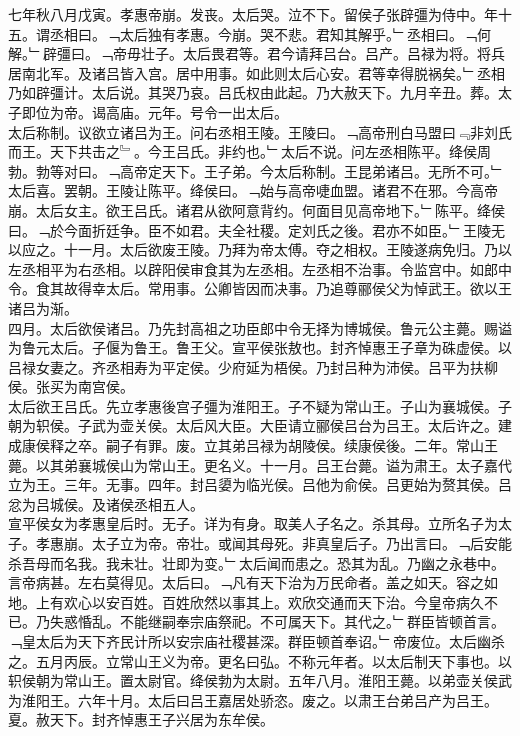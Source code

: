 \documentclass{zhvt-classic}
\begin{document}
\hspace*{2em}七年秋八月戊寅。孝惠帝崩。发丧。太后哭。泣不下。留侯子张辟彊为侍中。年十五。谓丞相曰。﹁太后独有孝惠。今崩。哭不悲。君知其解乎。﹂丞相曰。﹁何解。﹂辟彊曰。﹁帝毋壮子。太后畏君等。君今请拜吕台。吕产。吕禄为将。将兵居南北军。及诸吕皆入宫。居中用事。如此则太后心安。君等幸得脱祸矣。﹂丞相乃如辟彊计。太后说。其哭乃哀。吕氏权由此起。乃大赦天下。九月辛丑。葬。太子即位为帝。谒高庙。元年。号令一出太后。\\
\hspace*{2em}太后称制。议欲立诸吕为王。问右丞相王陵。王陵曰。﹁高帝刑白马盟曰﹃非刘氏而王。天下共击之﹄。今王吕氏。非约也。﹂太后不说。问左丞相陈平。绛侯周勃。勃等对曰。﹁高帝定天下。王子弟。今太后称制。王昆弟诸吕。无所不可。﹂太后喜。罢朝。王陵让陈平。绛侯曰。﹁始与高帝啑血盟。诸君不在邪。今高帝崩。太后女主。欲王吕氏。诸君从欲阿意背约。何面目见高帝地下。﹂陈平。绛侯曰。﹁於今面折廷争。臣不如君。夫全社稷。定刘氏之後。君亦不如臣。﹂王陵无以应之。十一月。太后欲废王陵。乃拜为帝太傅。夺之相权。王陵遂病免归。乃以左丞相平为右丞相。以辟阳侯审食其为左丞相。左丞相不治事。令监宫中。如郎中令。食其故得幸太后。常用事。公卿皆因而决事。乃追尊郦侯父为悼武王。欲以王诸吕为渐。\\
\hspace*{2em}四月。太后欲侯诸吕。乃先封高祖之功臣郎中令无择为博城侯。鲁元公主薨。赐谥为鲁元太后。子偃为鲁王。鲁王父。宣平侯张敖也。封齐悼惠王子章为硃虚侯。以吕禄女妻之。齐丞相寿为平定侯。少府延为梧侯。乃封吕种为沛侯。吕平为扶柳侯。张买为南宫侯。\\
\hspace*{2em}太后欲王吕氏。先立孝惠後宫子彊为淮阳王。子不疑为常山王。子山为襄城侯。子朝为轵侯。子武为壶关侯。太后风大臣。大臣请立郦侯吕台为吕王。太后许之。建成康侯释之卒。嗣子有罪。废。立其弟吕禄为胡陵侯。续康侯後。二年。常山王薨。以其弟襄城侯山为常山王。更名义。十一月。吕王台薨。谥为肃王。太子嘉代立为王。三年。无事。四年。封吕嬃为临光侯。吕他为俞侯。吕更始为赘其侯。吕忿为吕城侯。及诸侯丞相五人。\\
\hspace*{2em}宣平侯女为孝惠皇后时。无子。详为有身。取美人子名之。杀其母。立所名子为太子。孝惠崩。太子立为帝。帝壮。或闻其母死。非真皇后子。乃出言曰。﹁后安能杀吾母而名我。我未壮。壮即为变。﹂太后闻而患之。恐其为乱。乃幽之永巷中。言帝病甚。左右莫得见。太后曰。﹁凡有天下治为万民命者。盖之如天。容之如地。上有欢心以安百姓。百姓欣然以事其上。欢欣交通而天下治。今皇帝病久不已。乃失惑惛乱。不能继嗣奉宗庙祭祀。不可属天下。其代之。﹂群臣皆顿首言。﹁皇太后为天下齐民计所以安宗庙社稷甚深。群臣顿首奉诏。﹂帝废位。太后幽杀之。五月丙辰。立常山王义为帝。更名曰弘。不称元年者。以太后制天下事也。以轵侯朝为常山王。置太尉官。绛侯勃为太尉。五年八月。淮阳王薨。以弟壶关侯武为淮阳王。六年十月。太后曰吕王嘉居处骄恣。废之。以肃王台弟吕产为吕王。夏。赦天下。封齐悼惠王子兴居为东牟侯。\\
\end{document}

